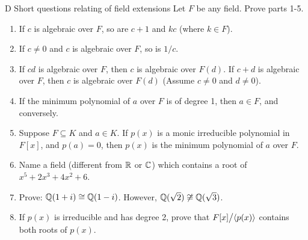 \begin{exercise}{D Short questions relating of field extensions}
Let $F$ be any field. Prove parts 1-5.
\begin{enumerate}
    \item If $c$ is algebraic over $F$, so are $c+1$ and $kc$ (where $k\in F$).
    \item If $c\neq 0$ and $c$ is algebraic over $F$, so is $1/c$.
    \item If $cd$ is algebraic over $F$, then $c$ is algebraic over $F(d)$. If $c+d$ is algebraic over $F$, then $c$ is algebraic over $F(d)$ (Assume $c\neq 0$ and $d\neq 0$).
    \item If the minimum polynomial of $a$ over $F$ is of degree 1, then $a\in F$, and conversely.
    \item Suppose $F\subseteq K$ and $a\in K$. If $p(x)$ is a monic irreducible polynomial in $F[x]$, and $p(a)=0$, then $p(x)$ is the minimum polynomial of $a$ over $F$.
    \item Name a field (different from $\mathbb{R}$ or $\mathbb{C}$) which contains a root of $x^5+2x^3+4x^2+6$.
    \item Prove: $\mathbb{Q}(1+i)\cong\mathbb{Q}(1-i)$. However, $\mathbb{Q}(\sqrt{2})\not\cong\mathbb{Q}(\sqrt{3})$.
    \item If $p(x)$ is irreducible and has degree 2, prove that ${\textstyle F[x]}\big/{\textstyle \langle p(x)\rangle}$ contains both roots of $p(x)$.
\end{enumerate}
\end{exercise}
